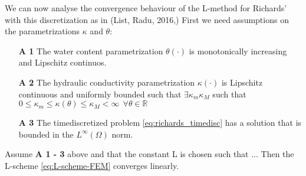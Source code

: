 \documentclass[../Main/main.tex]{subfiles}
\begin{document}
	We can now analyse the convergence behaviour of the L-method for Richards' with this discretization as in (List, Radu, 2016,\cite{list2016study})
	First we need assumptions on the parametrizations $\kappa $ and $\theta$:
	\begin{itemize}
		\item[\textbf{A 1}] The water content parametrization $\theta(\cdot)$ is monotonically increasing and Lipschitz continuos.
		\item[\textbf{A 2}] The hydraulic conductivity parametrization $\kappa(\cdot)$ is Lipschitz continuous and uniformly bounded such that
		$\exists \kappa_m \kappa_M$ such that $0\leq \kappa_m \leq \kappa(\theta) \leq \kappa_M < \infty \ \ \forall \theta \in \mathbb{R}$
		\item[\textbf{A 3}] The timediscretized problem \eqref{eq:richards_timedisc} has a solution that is bounded in the $L^{\infty}(\Omega)$ norm. 
	\end{itemize}
	\begin{theorem}
		Assume \textbf{A 1 - 3} above and that the constant L is chosen such that ... Then the L-scheme \eqref{eq:L-scheme-FEM} converges linearly. 
	\end{theorem}
\end{document}
